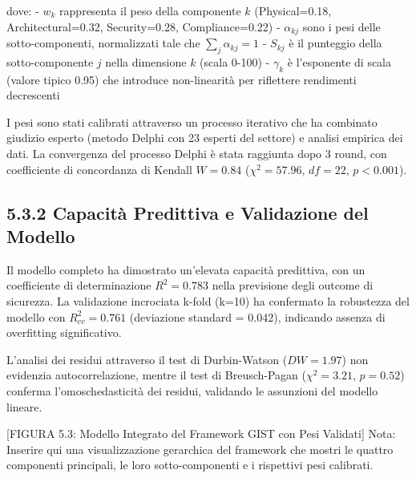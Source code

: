 dove:
- $w_k$ rappresenta il peso della componente $k$ (Physical=0.18, Architectural=0.32, Security=0.28, Compliance=0.22)
- $\alpha_{kj}$ sono i pesi delle sotto-componenti, normalizzati tale che $\sum_j \alpha_{kj} = 1$
- $S_{kj}$ è il punteggio della sotto-componente $j$ nella dimensione $k$ (scala 0-100)
- $\gamma_k$ è l'esponente di scala (valore tipico 0.95) che introduce non-linearità per riflettere rendimenti decrescenti

I pesi sono stati calibrati attraverso un processo iterativo che ha combinato giudizio esperto (metodo Delphi con 23 esperti del settore) e analisi empirica dei dati. La convergenza del processo Delphi è stata raggiunta dopo 3 round, con coefficiente di concordanza di Kendall $W = 0.84$ ($\chi^2 = 57.96$, $df = 22$, $p < 0.001$).

\subsection{5.3.2 Capacità Predittiva e Validazione del Modello}

Il modello completo ha dimostrato un'elevata capacità predittiva, con un coefficiente di determinazione $R^2 = 0.783$ nella previsione degli outcome di sicurezza. La validazione incrociata k-fold (k=10) ha confermato la robustezza del modello con $R^2_{cv} = 0.761$ (deviazione standard = 0.042), indicando assenza di overfitting significativo.

L'analisi dei residui attraverso il test di Durbin-Watson ($DW = 1.97$) non evidenzia autocorrelazione, mentre il test di Breusch-Pagan ($\chi^2 = 3.21$, $p = 0.52$) conferma l'omoschedasticità dei residui, validando le assunzioni del modello lineare.

[FIGURA 5.3: Modello Integrato del Framework GIST con Pesi Validati]
Nota: Inserire qui una visualizzazione gerarchica del framework che mostri le quattro componenti principali, le loro sotto-componenti e i rispettivi pesi calibrati.

